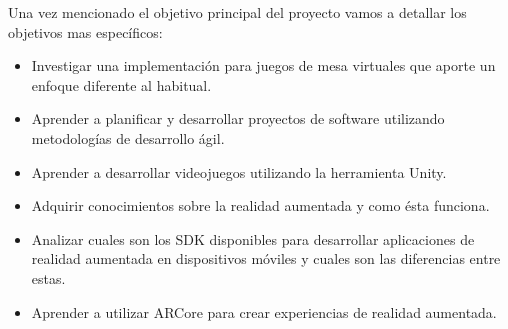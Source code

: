 Una vez mencionado el objetivo principal del proyecto vamos a detallar los objetivos mas específicos:
\begin{itemize}
  \item Investigar una implementación para juegos de mesa virtuales que aporte un enfoque diferente al habitual.
  \item Aprender a planificar y desarrollar proyectos de software utilizando metodologías de desarrollo ágil.
  \item Aprender a desarrollar videojuegos utilizando la herramienta Unity.
  \item Adquirir conocimientos sobre la realidad aumentada y como ésta funciona.
  \item Analizar cuales son los SDK disponibles para desarrollar aplicaciones de realidad aumentada en dispositivos móviles y cuales son las diferencias entre estas.
  \item Aprender a utilizar ARCore para crear experiencias de realidad aumentada.
\end{itemize}
